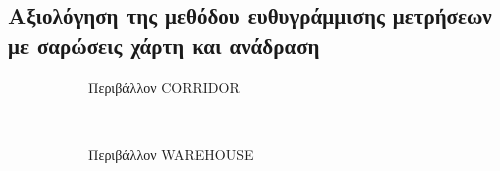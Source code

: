 \subsection{Αξιολόγηση της μεθόδου ευθυγράμμισης μετρήσεων με σαρώσεις χάρτη και ανάδραση}

\begin{figure}[h]
  \begin{subfigure}{\linewidth}
  \hspace{-1.25cm}
    
    \vspace{0.3cm}
    \caption{Περιβάλλον CORRIDOR}
    \label{}
  \end{subfigure}\\
  \begin{subfigure}{\linewidth}\vspace{0.5cm}
    \hspace{-1.25cm}
    
    \vspace{0.3cm}
    \caption{Περιβάλλον WAREHOUSE}
    \label{}
    \end{subfigure}
\caption{}
\label{}
\end{figure}
